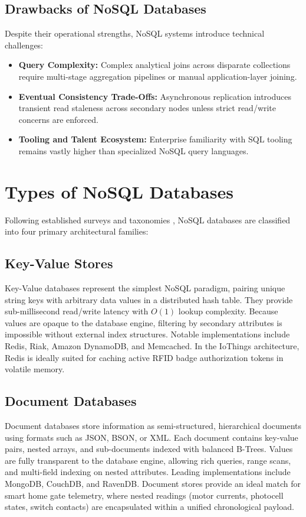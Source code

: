 \documentclass[11pt,a4paper]{article}
\begin{document}
\subsection{Drawbacks of NoSQL Databases}
Despite their operational strengths, NoSQL systems introduce technical challenges:
\begin{itemize}[noitemsep]
    \item \textbf{Query Complexity:} Complex analytical joins across disparate collections require multi-stage aggregation pipelines or manual application-layer joining.
    \item \textbf{Eventual Consistency Trade-Offs:} Asynchronous replication introduces transient read staleness across secondary nodes unless strict read/write concerns are enforced.
    \item \textbf{Tooling and Talent Ecosystem:} Enterprise familiarity with SQL tooling remains vastly higher than specialized NoSQL query languages.
\end{itemize}

\section{Types of NoSQL Databases}

Following established surveys and taxonomies \citep{hecht2011, han2011, tudorica2011}, NoSQL databases are classified into four primary architectural families:

\subsection{Key-Value Stores}
Key-Value databases represent the simplest NoSQL paradigm, pairing unique string keys with arbitrary data values in a distributed hash table. They provide sub-millisecond read/write latency with $O(1)$ lookup complexity. Because values are opaque to the database engine, filtering by secondary attributes is impossible without external index structures. Notable implementations include Redis, Riak, Amazon DynamoDB, and Memcached. In the IoThings architecture, Redis is ideally suited for caching active RFID badge authorization tokens in volatile memory.

\subsection{Document Databases}
Document databases store information as semi-structured, hierarchical documents using formats such as JSON, BSON, or XML. Each document contains key-value pairs, nested arrays, and sub-documents indexed with balanced B-Trees. Values are fully transparent to the database engine, allowing rich queries, range scans, and multi-field indexing on nested attributes. Leading implementations include MongoDB, CouchDB, and RavenDB. Document stores provide an ideal match for smart home gate telemetry, where nested readings (motor currents, photocell states, switch contacts) are encapsulated within a unified chronological payload.
\end{document}
